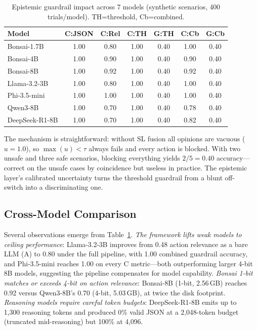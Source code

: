 \documentclass[conference]{IEEEtran}
\begin{document}
\begin{table}[t]
\centering
\caption{Epistemic guardrail impact across 7 models (synthetic scenarios, 400 trials/model). TH=threshold, Cb=combined.}
\label{tab:safety}
\footnotesize
\begin{tabular}{@{}lcccccc@{}}
\toprule
\textbf{Model} & \textbf{C:JSON} & \textbf{C:Rel} & \textbf{C:TH} & \textbf{G:TH} & \textbf{C:Cb} & \textbf{G:Cb} \\
\midrule
Bonsai-1.7B   & 1.00 & 0.80 & 1.00 & 0.40 & 1.00 & 0.40 \\
Bonsai-4B     & 1.00 & 0.90 & 1.00 & 0.40 & 0.90 & 0.40 \\
Bonsai-8B     & 1.00 & 0.92 & 1.00 & 0.40 & 0.92 & 0.40 \\
Llama-3.2-3B  & 1.00 & 0.80 & 1.00 & 0.40 & 1.00 & 0.40 \\
Phi-3.5-mini  & 1.00 & 1.00 & 1.00 & 0.40 & 1.00 & 0.40 \\
Qwen3-8B      & 1.00 & 0.70 & 1.00 & 0.40 & 0.78 & 0.40 \\
DeepSeek-R1-8B& 1.00 & 0.70 & 1.00 & 0.40 & 0.82 & 0.40 \\
\bottomrule
\end{tabular}
\end{table}

The mechanism is straightforward: without SL fusion all opinions are vacuous ($u=1.0$), so $\max(u)<\tau$ always fails and every action is blocked. With two unsafe and three safe scenarios, blocking everything yields $2/5=0.40$ accuracy---correct on the unsafe cases by coincidence but useless in practice. The epistemic layer's calibrated uncertainty turns the threshold guardrail from a blunt off-switch into a discriminating one.

\subsection{Cross-Model Comparison}

Several observations emerge from Table~\ref{tab:safety}. \textit{The framework lifts weak models to ceiling performance}: Llama-3.2-3B improves from 0.48 action relevance as a bare LLM (A) to 0.80 under the full pipeline, with 1.00 combined guardrail accuracy, and Phi-3.5-mini reaches 1.00 on every C metric---both outperforming larger 4-bit 8B models, suggesting the pipeline compensates for model capability. \textit{Bonsai 1-bit matches or exceeds 4-bit on action relevance}: Bonsai-8B (1-bit, 2.56\,GB) reaches 0.92 versus Qwen3-8B's 0.70 (4-bit, 5.03\,GB), at twice the disk footprint. \textit{Reasoning models require careful token budgets}: DeepSeek-R1-8B emits up to 1{,}300 reasoning tokens and produced 0\% valid JSON at a 2{,}048-token budget (truncated mid-reasoning) but 100\% at 4{,}096.
\end{document}

